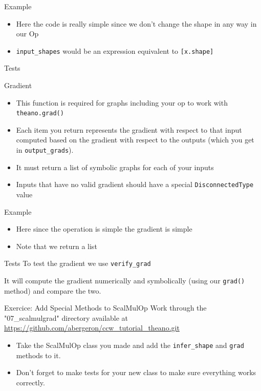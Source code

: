 \documentclass[utf8x]{beamer}
\newcommand{\code}[1]{\lstinline[emph={[2]}]|#1|}
\begin{document}
\begin{frame}{Example}

\begin{itemize}
\item Here the code is really simple since we don't change the shape in any way in our Op
\item \code{input_shapes} would be an expression equivalent to \code{[x.shape]}
\end{itemize}
\end{frame}

\begin{frame}{Tests}

\end{frame}

\begin{frame}{Gradient}

\begin{itemize}
\item This function is required for graphs including your op to work with \code{theano.grad()}
\item Each item you return represents the gradient with respect to that input computed based on the gradient with respect to the outputs (which you get in \code{output_grads}).
\item It must return a list of symbolic graphs for each of your inputs
\item Inputs that have no valid gradient should have a special \code{DisconnectedType} value
\end{itemize}
\end{frame}

\begin{frame}{Example}

\begin{itemize}
\item Here since the operation is simple the gradient is simple
\item Note that we return a list
\end{itemize}
\end{frame}

\begin{frame}{Tests}
To test the gradient we use \code{verify_grad}

It will compute the gradient numerically and symbolically (using our \code{grad()} method) and compare the two.
\end{frame}

\begin{frame}{Exercice: Add Special Methods to ScalMulOp}
Work through the "07\_scalmulgrad" directory available at \url{https://github.com/abergeron/ccw_tutorial_theano.git}
\begin{itemize}
\item Take the ScalMulOp class you made and add the \code{infer_shape} and \code{grad} methods to it.
\item Don't forget to make tests for your new class to make sure everything works correctly.
\end{itemize}
\end{frame}
\end{document}

